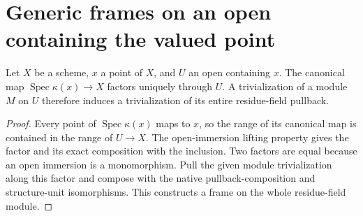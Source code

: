 \section{Generic frames on an open containing the valued point}

\begin{definition}\label{def:scheme-support-line-frame}
\leanok
Let $X$ be a scheme, $x$ a point of $X$, and $U$ an open containing
$x$. The canonical map $\operatorname{Spec}\kappa(x)\to X$ factors
uniquely through $U$. A trivialization of a module $M$ on $U$ therefore
induces a trivialization of its entire residue-field pullback.
\end{definition}
\begin{proof}
Every point of $\operatorname{Spec}\kappa(x)$ maps to $x$, so the range
of its canonical map is contained in the range of $U\to X$. The
open-immersion lifting property gives the factor and its exact
composition with the inclusion. Two factors are equal because an
open immersion is a monomorphism. Pull the given module trivialization
along this factor and compose with the native pullback-composition
and structure-unit isomorphisms. This constructs a frame on the
whole residue-field module.
\end{proof}

